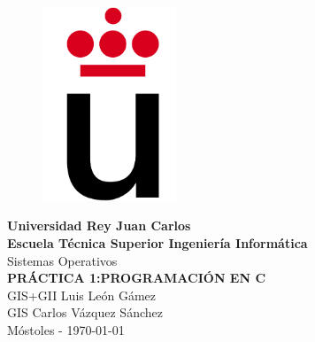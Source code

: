 \setlength{\unitlength}{1 cm} %
\thispagestyle{empty}
\begin{figure}[htb]
\begin{center}
\includegraphics[width=4cm]{./logoURJC}
\end{center}
\end{figure}
\begin{center}
\textbf{{\Huge Universidad Rey Juan Carlos}\\[0.5cm]
{\LARGE Escuela Técnica Superior Ingeniería Informática}}\\[1.25cm]
{\Large Sistemas Operativos}\\[2.3cm]
{\LARGE \textbf{ PRÁCTICA 1:PROGRAMACIÓN EN C}}\\[3cm]
{\large GIS+GII Luis León Gámez}\\[1cm]
{\large GIS Carlos Vázquez Sánchez}\\[1cm]
Móstoles - \today
\end{center}